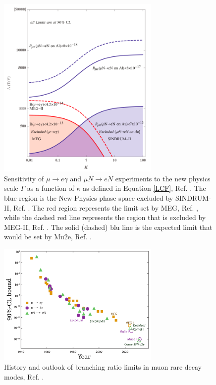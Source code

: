\begin{figure}[!h]
\centering
\includegraphics[width =0.7\textwidth]{figures/png/Screenshot_20240313_120457.png}
\caption[Sensitivity of $\mu \rightarrow e\gamma$ and $\mu N \rightarrow eN$ experiments.]{Sensitivity of $\mu \rightarrow e\gamma$ and $\mu N \rightarrow eN$ experiments to the new physics
scale $\Gamma$ as a function of $\kappa$ as defined in Equation \ref{LCF}, Ref. \cite{CGroup:2022tli}. The blue region is the New
Physics phase space excluded by SINDRUM-II, Ref. \cite{SINDRUMII:2006dvw}. The red region represents the
limit set by MEG, Ref. \cite{megi}, while the dashed red line represents the region that is
excluded by MEG-II, Ref. \cite{megiicollaboration2024search}. The solid (dashed) blu line is the
expected limit that would be set by Mu2e, Ref. \cite{universe9010054}.}
\label{fig:muchannelbr}
\end{figure}
\begin{figure}[!h]
  \centering
  \includegraphics[width =0.7\textwidth]{figures/png/Screenshot_20240307_161549.png}
  \caption[Branching ratio limits in muon rare decay modes.]{History and outlook of branching ratio limits in muon rare decay modes, Ref. \cite{MARCIANO1977303}.}
  \label{fig:muchannel}
  \end{figure}
